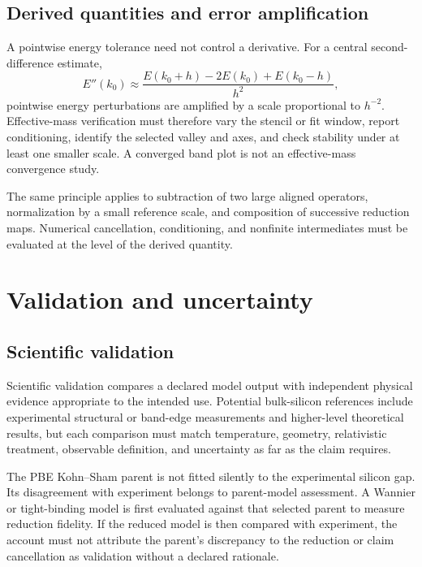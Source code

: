 \subsection{Derived quantities and error amplification}


A pointwise energy tolerance need not control a derivative. For a central
second-difference estimate,
\begin{equation}
  E''(k_0)
  \approx
  \frac{E(k_0+h)-2E(k_0)+E(k_0-h)}{h^2},
\end{equation}
pointwise energy perturbations are amplified by a scale proportional to
$h^{-2}$. Effective-mass verification must therefore vary the stencil or fit
window, report conditioning, identify the selected valley and axes, and check
stability under at least one smaller scale. A converged band plot is not an
effective-mass convergence study.

The same principle applies to subtraction of two large aligned operators,
normalization by a small reference scale, and composition of successive
reduction maps. Numerical cancellation, conditioning, and nonfinite
intermediates must be evaluated at the level of the derived quantity.

\section{Validation and uncertainty}

\subsection{Scientific validation}


Scientific validation compares a declared model output with independent
physical evidence appropriate to the intended use. Potential bulk-silicon
references include experimental structural or band-edge measurements and
higher-level theoretical results, but each comparison must match temperature,
geometry, relativistic treatment, observable definition, and uncertainty as far
as the claim requires.

The PBE Kohn--Sham parent is not fitted silently to the experimental silicon gap.
Its disagreement with experiment belongs to parent-model assessment. A
Wannier or tight-binding model is first evaluated against that selected parent
to measure reduction fidelity. If the reduced model is then compared with
experiment, the account must not attribute the parent's discrepancy to the
reduction or claim cancellation as validation without a declared rationale.

